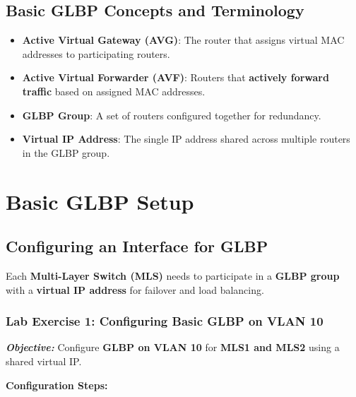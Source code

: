 \documentclass[a4paper]{book}
\begin{document}
\subsection{Basic GLBP Concepts and Terminology}
\begin{itemize}
\item \textbf{Active Virtual Gateway (AVG)}: The router that assigns virtual MAC addresses 
to participating routers.
\item \textbf{Active Virtual Forwarder (AVF)}: Routers that \textbf{actively forward traffic} 
based on assigned MAC addresses.
\item \textbf{GLBP Group}: A set of routers configured together for redundancy.
\item \textbf{Virtual IP Address}: The single IP address shared across multiple routers in 
the GLBP group.
\end{itemize}


\vspace{1em}

\section{Basic GLBP Setup}

\subsection{Configuring an Interface for GLBP}
Each \textbf{Multi-Layer Switch (MLS)} needs to participate in a \textbf{GLBP group} with a 
\textbf{virtual IP address} for failover and load balancing.

\subsubsection{Lab Exercise 1: Configuring Basic GLBP on VLAN 10}
\textbf{\textit{Objective:}} Configure \textbf{GLBP on VLAN 10} for \textbf{MLS1 and MLS2} 
using a shared virtual IP.
\vspace{1em}

\textbf{Configuration Steps:}
\vspace{1.5em}

\end{document}
